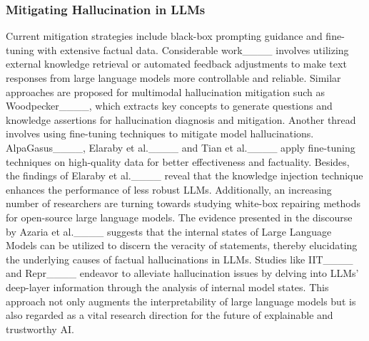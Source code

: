\subsubsection*{\textbf{Mitigating Hallucination in LLMs}}
Current mitigation strategies include black-box prompting guidance and fine-tuning with extensive factual data. 
Considerable work____ involves utilizing external knowledge retrieval or automated feedback adjustments to make text responses from large language models more controllable and reliable. 
Similar approaches are proposed for multimodal hallucination mitigation such as Woodpecker____, which extracts key concepts to generate questions and knowledge assertions for hallucination diagnosis and mitigation.
Another thread involves using fine-tuning techniques to mitigate model hallucinations. AlpaGasus____, Elaraby et al.____ and Tian et al.____ apply fine-tuning techniques on high-quality data for better effectiveness and factuality. 
Besides, the findings of Elaraby et al.____ reveal that the knowledge injection technique enhances the performance of less robust LLMs. 
Additionally, an increasing number of researchers are turning towards studying white-box repairing methods for open-source large language models. 
The evidence presented in the discourse by Azaria et al.____ suggests that the internal states of Large Language Models can be utilized to discern the veracity of statements, thereby elucidating the underlying causes of factual hallucinations in LLMs. 
Studies like IIT____ and Repr____ endeavor to alleviate hallucination issues by delving into LLMs' deep-layer information through the analysis of internal model states. 
This approach not only augments the interpretability of large language models but is also regarded as a vital research direction for the future of explainable and trustworthy AI.



